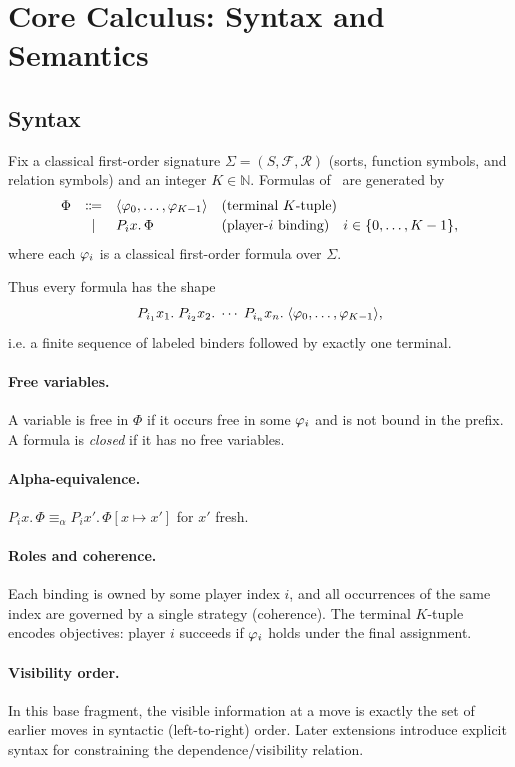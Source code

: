
\section{Core Calculus: Syntax and Semantics}
\label{sec:k-core}

\subsection{Syntax}

Fix a classical first-order signature $\Sigma=(S,\mathcal F,\mathcal R)$ (sorts, function symbols, and relation symbols) and an integer $K \in \mathbb{N}$. Formulas of \KFOL\ are generated by
\[
\begin{array}{rcll}
\Phi &\Coloneqq& \langle \varphi_0,\ldots,\varphi_{K-1}\rangle
  & \text{(terminal $K$-tuple)}\\[2pt]
     &\mid& P_i x.\,\Phi
  & \text{(player-$i$ binding)} \quad i\in\{0,\ldots,K-1\},
\end{array}
\]
where each $\varphi_i$ is a classical first-order formula over $\Sigma$.

Thus every formula has the shape
\[
P_{i_1} x_1.\; P_{i_2} x_2.\; \cdots\; P_{i_n} x_n.\;
\langle \varphi_0,\ldots,\varphi_{K-1}\rangle,
\]
i.e. a finite sequence of labeled binders followed by exactly one terminal.

\paragraph{Free variables.}
A variable is free in $\Phi$ if it occurs free in some $\varphi_i$ and is not bound in the prefix. A formula is \emph{closed} if it has no free variables.

\paragraph{Alpha-equivalence.}
$P_i x.\,\Phi \equiv_\alpha P_i x'.\,\Phi[x\mapsto x']$ for $x'$ fresh.

\paragraph{Roles and coherence.}
Each binding is owned by some player index $i$, and all occurrences of the same index are governed by a single strategy (coherence). The terminal $K$-tuple encodes objectives: player $i$ succeeds if $\varphi_i$ holds under the final assignment.

\paragraph{Visibility order.}
In this base fragment, the visible information at a move is exactly the set of earlier moves in syntactic (left-to-right) order. Later extensions introduce explicit syntax for constraining the dependence/visibility relation.

